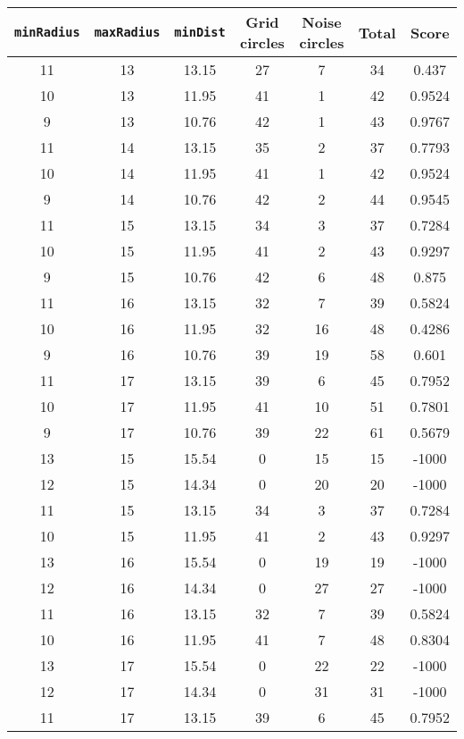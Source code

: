 \documentclass[letterpaper, 12pt]{article}
\begin{document}
\begin{longtable}{|c|c|c|c|c|c|c|}
\hline
\textbf{\texttt{minRadius}} & \textbf{\texttt{maxRadius}} & \textbf{\texttt{minDist}} & \textbf{Grid circles} & \textbf{Noise circles} & \textbf{Total} & \textbf{Score} \\
\hline
11 & 13 & 13.15 & 27 & 7 & 34 & 0.437 \\
\hline
10 & 13 & 11.95 & 41 & 1 & 42 & 0.9524 \\
\hline
9 & 13 & 10.76 & 42 & 1 & 43 & 0.9767 \\
\hline
11 & 14 & 13.15 & 35 & 2 & 37 & 0.7793 \\
\hline
10 & 14 & 11.95 & 41 & 1 & 42 & 0.9524 \\
\hline
9 & 14 & 10.76 & 42 & 2 & 44 & 0.9545 \\
\hline
11 & 15 & 13.15 & 34 & 3 & 37 & 0.7284 \\
\hline
10 & 15 & 11.95 & 41 & 2 & 43 & 0.9297 \\
\hline
9 & 15 & 10.76 & 42 & 6 & 48 & 0.875 \\
\hline
11 & 16 & 13.15 & 32 & 7 & 39 & 0.5824 \\
\hline
10 & 16 & 11.95 & 32 & 16 & 48 & 0.4286 \\
\hline
9 & 16 & 10.76 & 39 & 19 & 58 & 0.601 \\
\hline
11 & 17 & 13.15 & 39 & 6 & 45 & 0.7952 \\
\hline
10 & 17 & 11.95 & 41 & 10 & 51 & 0.7801 \\
\hline
9 & 17 & 10.76 & 39 & 22 & 61 & 0.5679 \\
\hline
13 & 15 & 15.54 & 0 & 15 & 15 & -1000 \\
\hline
12 & 15 & 14.34 & 0 & 20 & 20 & -1000 \\
\hline
11 & 15 & 13.15 & 34 & 3 & 37 & 0.7284 \\
\hline
10 & 15 & 11.95 & 41 & 2 & 43 & 0.9297 \\
\hline
13 & 16 & 15.54 & 0 & 19 & 19 & -1000 \\
\hline
12 & 16 & 14.34 & 0 & 27 & 27 & -1000 \\
\hline
11 & 16 & 13.15 & 32 & 7 & 39 & 0.5824 \\
\hline
10 & 16 & 11.95 & 41 & 7 & 48 & 0.8304 \\
\hline
13 & 17 & 15.54 & 0 & 22 & 22 & -1000 \\
\hline
12 & 17 & 14.34 & 0 & 31 & 31 & -1000 \\
\hline
11 & 17 & 13.15 & 39 & 6 & 45 & 0.7952 \\
\hline

\end{longtable}
\end{document}
